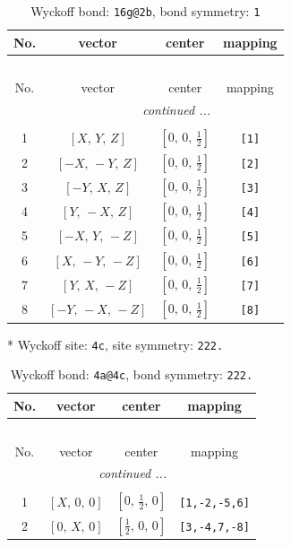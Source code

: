 \documentclass[fleqn,8pt]{jsarticle}
\begin{document}
\begin{longtable}{cccc}
\caption{Wyckoff bond: {\tt 16g@2b}, bond symmetry: {\tt 1}}
 \\
 \hline \hline
No. & vector & center & mapping \\ \hline \endfirsthead

\multicolumn{3}{l}{\tablename\ \thetable{}} \\
 \hline \hline
No. & vector & center & mapping \\ \hline \endhead

 \hline \hline
\multicolumn{3}{r}{\footnotesize\it continued ...} \\ \endfoot

 \hline \hline
\multicolumn{3}{r}{} \\ \endlastfoot

1 & $\left[ X,\, Y,\, Z \right]$ & $\left[ 0,\, 0,\, \frac{1}{2} \right]$ & {\tt [1]} \\ \hline
2 & $\left[ - X,\, - Y,\, Z \right]$ & $\left[ 0,\, 0,\, \frac{1}{2} \right]$ & {\tt [2]} \\ \hline
3 & $\left[ - Y,\, X,\, Z \right]$ & $\left[ 0,\, 0,\, \frac{1}{2} \right]$ & {\tt [3]} \\ \hline
4 & $\left[ Y,\, - X,\, Z \right]$ & $\left[ 0,\, 0,\, \frac{1}{2} \right]$ & {\tt [4]} \\ \hline
5 & $\left[ - X,\, Y,\, - Z \right]$ & $\left[ 0,\, 0,\, \frac{1}{2} \right]$ & {\tt [5]} \\ \hline
6 & $\left[ X,\, - Y,\, - Z \right]$ & $\left[ 0,\, 0,\, \frac{1}{2} \right]$ & {\tt [6]} \\ \hline
7 & $\left[ Y,\, X,\, - Z \right]$ & $\left[ 0,\, 0,\, \frac{1}{2} \right]$ & {\tt [7]} \\ \hline
8 & $\left[ - Y,\, - X,\, - Z \right]$ & $\left[ 0,\, 0,\, \frac{1}{2} \right]$ & {\tt [8]} \\
\end{longtable}
* Wyckoff site: {\tt 4c}, site symmetry: {\tt 222.}
\renewcommand{\arraystretch}{1.2}
\begin{longtable}{cccc}
\caption{Wyckoff bond: {\tt 4a@4c}, bond symmetry: {\tt 222.}}
 \\
 \hline \hline
No. & vector & center & mapping \\ \hline \endfirsthead

\multicolumn{3}{l}{\tablename\ \thetable{}} \\
 \hline \hline
No. & vector & center & mapping \\ \hline \endhead

 \hline \hline
\multicolumn{3}{r}{\footnotesize\it continued ...} \\ \endfoot

 \hline \hline
\multicolumn{3}{r}{} \\ \endlastfoot

1 & $\left[ X,\, 0,\, 0 \right]$ & $\left[ 0,\, \frac{1}{2},\, 0 \right]$ & {\tt [1,-2,-5,6]} \\ \hline
2 & $\left[ 0,\, X,\, 0 \right]$ & $\left[ \frac{1}{2},\, 0,\, 0 \right]$ & {\tt [3,-4,7,-8]} \\
\end{longtable}
\end{document}
